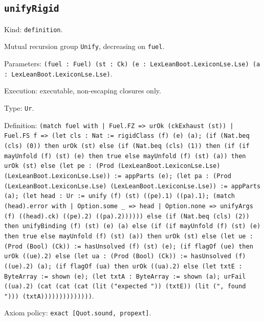 \documentclass[11pt]{article}
\begin{document}
\subsection*{\texttt{unifyRigid}}
\noindent Kind: \texttt{definition}.\par
\noindent Mutual recursion group \texttt{Unify}, decreasing on \texttt{fuel}.\par
\noindent Parameters: \texttt{(fuel : Fuel) (st : Ck) (e : LexLeanBoot.LexiconLse.Lse) (a : LexLeanBoot.LexiconLse.Lse)}.\par
\noindent Execution: executable, non-escaping closures only.\par
\noindent Type: \texttt{Ur}.\par
\noindent Definition: \texttt{(match fuel with | Fuel.FZ => urOk (ckExhaust (st)) | Fuel.FS f => (let cls : Nat := rigidClass (f) (e) (a); (if (Nat.beq (cls) (0)) then urOk (st) else (if (Nat.beq (cls) (1)) then (if (if mayUnfold (f) (st) (e) then true else mayUnfold (f) (st) (a)) then urOk (st) else (let pe : (Prod (LexLeanBoot.LexiconLse.Lse) (LexLeanBoot.LexiconLse.Lse)) := appParts (e); (let pa : (Prod (LexLeanBoot.LexiconLse.Lse) (LexLeanBoot.LexiconLse.Lse)) := appParts (a); (let head : Ur := unify (f) (st) ((pe).1) ((pa).1); (match (head).error with | Option.some \_ => head | Option.none => unifyArgs (f) ((head).ck) ((pe).2) ((pa).2)))))) else (if (Nat.beq (cls) (2)) then unifyBinding (f) (st) (e) (a) else (if (if mayUnfold (f) (st) (e) then true else mayUnfold (f) (st) (a)) then urOk (st) else (let ue : (Prod (Bool) (Ck)) := hasUnsolved (f) (st) (e); (if flagOf (ue) then urOk ((ue).2) else (let ua : (Prod (Bool) (Ck)) := hasUnsolved (f) ((ue).2) (a); (if flagOf (ua) then urOk ((ua).2) else (let txtE : ByteArray := shown (e); (let txtA : ByteArray := shown (a); urFail ((ua).2) (cat (cat (cat (lit ("expected ")) (txtE)) (lit (", found "))) (txtA))))))))))))))}.\par
\noindent Axiom policy: \texttt{exact [Quot.sound, propext]}.\par
\end{document}
